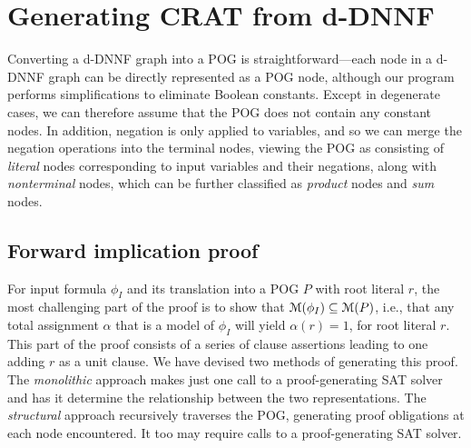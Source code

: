 \documentclass[letterpaper,USenglish,cleveref, autoref, thm-restate]{lipics-v2021}
\newcommand{\assign}{\alpha}
\newcommand{\modelset}{{\cal M}}
\newcommand{\inputformula}{\phi_I}
\newcommand{\progname}[1]{\textsc{#1}}
\newcommand{\dfour}{\progname{D4}}
\begin{document}
\section{Generating CRAT from d-DNNF}
\label{section:generating:crat}

Converting a d-DNNF
graph into a POG is straightforward---each node in a d-DNNF graph can
be directly represented as a POG node, although
our program performs simplifications to
eliminate Boolean constants.
Except in degenerate cases,
we can therefore assume
that the POG does not contain any constant nodes.
In addition, negation is only
applied to variables, and so we can merge the negation operations into the terminal nodes,
viewing the POG as consisting
of {\em literal} nodes corresponding to input variables and their negations, along with
{\em nonterminal} nodes, which can be further classified as {\em product} nodes and {\em sum} nodes.

\subsection{Forward implication proof}

For input formula $\inputformula$ and its translation into a POG $P$
with root literal $r$, the most challenging part of the proof is to
show that $\modelset(\inputformula) \subseteq \modelset(P)$, i.e.,
that any total assignment $\alpha$ that is a model of $\inputformula$
will yield $\assign(r) = 1$, for root literal $r$.  This part of the
proof consists of a series of clause assertions leading to one adding
$r$ as a unit clause.  We have devised two methods of generating this
proof.  The {\em monolithic} approach makes just one call to a
proof-generating SAT solver and has it determine the relationship
between the two representations.  The {\em structural} approach
recursively traverses the POG, generating proof obligations at each
node encountered.  It too may require calls to a proof-generating SAT
solver.
\end{document}
